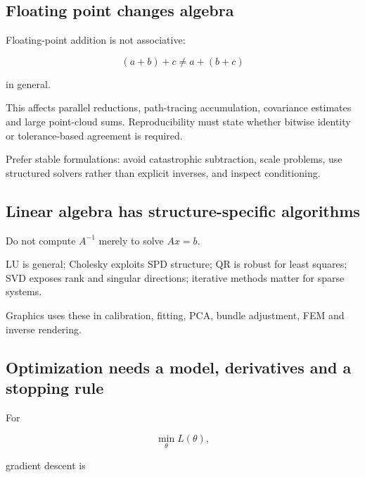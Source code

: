 \subsection{Floating point changes algebra}\label{01-foundations-i-ch017-floating-point-changes-algebra}

\hypertarget{01-foundations-i-ch017-floating-point-changes-algebra}{}

Floating-point addition is not associative:

\[
(a+b)+c\neq a+(b+c)
\]

in general.

This affects parallel reductions, path-tracing accumulation, covariance estimates and large point-cloud sums. Reproducibility must state whether bitwise identity or tolerance-based agreement is required.

Prefer stable formulations: avoid catastrophic subtraction, scale problems, use structured solvers rather than explicit inverses, and inspect conditioning.

\subsection{Linear algebra has structure-specific algorithms}\label{01-foundations-i-ch017-linear-algebra-has-structure-specific-algorithms}

\hypertarget{01-foundations-i-ch017-linear-algebra-has-structure-specific-algorithms}{}

Do not compute \(A^{-1}\) merely to solve \(Ax=b\).

LU is general; Cholesky exploits SPD structure; QR is robust for least squares; SVD exposes rank and singular directions; iterative methods matter for sparse systems.

Graphics uses these in calibration, fitting, PCA, bundle adjustment, FEM and inverse rendering.

\subsection{Optimization needs a model, derivatives and a stopping rule}\label{01-foundations-i-ch017-optimization-needs-a-model-derivatives-and-a-stopping-rule}

\hypertarget{01-foundations-i-ch017-optimization-needs-a-model-derivatives-and-a-stopping-rule}{}

For

\[
\min_\theta L(\theta),
\]

gradient descent is


